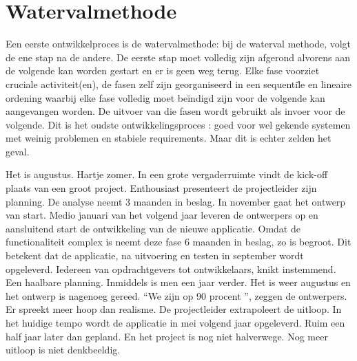 \section{Watervalmethode}
Een eerste ontwikkelproces is de watervalmethode: bij de waterval methode, volgt de ene stap na de andere. De eerste stap moet volledig zijn afgerond alvorens aan de volgende kan worden gestart en er is geen weg terug. Elke fase voorziet cruciale activiteit(en), de fasen zelf zijn georganiseerd in een sequenti\"le en lineaire ordening waarbij elke fase volledig moet be\"indigd zijn voor de volgende kan aangevangen worden. De uitvoer van die fasen wordt gebruikt als invoer voor de volgende. Dit is het oudste ontwikkelingsproces : goed voor wel gekende systemen met weinig problemen en stabiele requirements. Maar dit is echter zelden het geval.

\begin{example}
	Het is augustus. Hartje zomer. In een grote vergaderruimte vindt de kick-off plaats van een groot project. Enthousiast presenteert de projectleider zijn planning. De analyse neemt 3 maanden in beslag. In november gaat het ontwerp van start. Medio januari van het volgend jaar leveren de ontwerpers op en aansluitend start de ontwikkeling van de nieuwe applicatie. Omdat de functionaliteit complex is neemt deze fase 6 maanden in beslag, zo is begroot. Dit betekent dat de applicatie, na uitvoering en testen in september wordt opgeleverd. Iedereen van opdrachtgevers tot ontwikkelaars, knikt instemmend. Een haalbare planning.
Inmiddels is men een jaar verder. Het is weer augustus en het ontwerp is nagenoeg gereed. ``We zijn op 90 procent '', zeggen de ontwerpers. Er spreekt meer hoop dan realisme. De projectleider extrapoleert de uitloop. In het huidige tempo wordt de applicatie in mei volgend jaar opgeleverd. Ruim een half jaar later dan gepland. En het project is nog niet halverwege. Nog meer uitloop is niet denkbeeldig.
\end{example}

